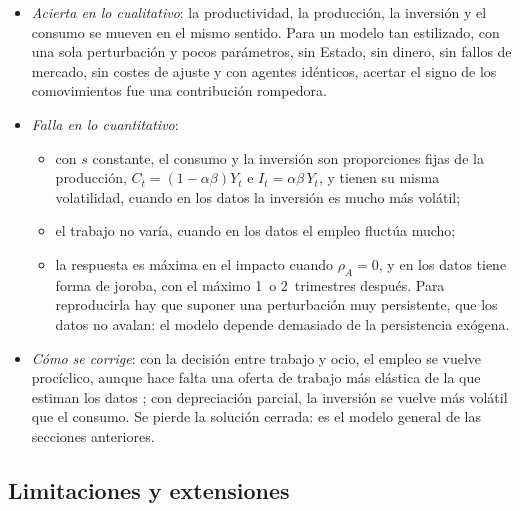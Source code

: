 \documentclass[11pt]{article}
\begin{document}
\begin{itemize}
\item \emph{Acierta en lo cualitativo}: la productividad, la producción, la inversión y el consumo se mueven en el mismo sentido. Para un modelo tan estilizado, con una sola perturbación y pocos parámetros, sin Estado, sin dinero, sin fallos de mercado, sin costes de ajuste y con agentes idénticos, acertar el signo de los comovimientos fue una contribución rompedora.
\item \emph{Falla en lo cuantitativo}:
  \begin{itemize}
  \item con $s$ constante, el consumo y la inversión son proporciones fijas de la producción, $C_t=(1-\alpha\beta)Y_t$ e $I_t=\alpha\beta\,Y_t$, y tienen su misma volatilidad, cuando en los datos la inversión es mucho más volátil;
  \item el trabajo no varía, cuando en los datos el empleo fluctúa mucho;
  \item la respuesta es máxima en el impacto cuando $\rho_A=0$, y en los datos tiene forma de joroba, con el máximo 1~o 2~trimestres después. Para reproducirla hay que suponer una perturbación muy persistente, que los datos no avalan: el modelo depende demasiado de la persistencia exógena.
  \end{itemize}
\item \emph{Cómo se corrige}: con la decisión entre trabajo y ocio, el empleo se vuelve procíclico, aunque hace falta una oferta de trabajo más elástica de la que estiman los datos ; con depreciación parcial, la inversión se vuelve más volátil que el consumo. Se pierde la solución cerrada: es el modelo general de las secciones anteriores.
\end{itemize}

\subsection{Limitaciones y extensiones}
\end{document}
